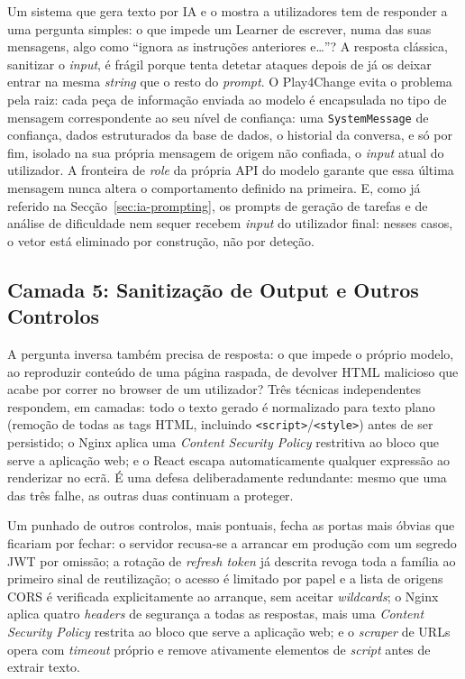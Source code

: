 Um sistema que gera texto por IA e o mostra a utilizadores tem de responder a uma pergunta simples: o que impede um Learner de escrever, numa das suas mensagens, algo como ``ignora as instruções anteriores e\ldots''? A resposta clássica, sanitizar o \textit{input}, é frágil porque tenta detetar ataques depois de já os deixar entrar na mesma \textit{string} que o resto do \textit{prompt}. O Play4Change evita o problema pela raiz: cada peça de informação enviada ao modelo é encapsulada no tipo de mensagem correspondente ao seu nível de confiança: uma \texttt{SystemMessage} de confiança, dados estruturados da base de dados, o historial da conversa, e só por fim, isolado na sua própria mensagem de origem não confiada, o \textit{input} atual do utilizador. A fronteira de \textit{role} da própria API do modelo garante que essa última mensagem nunca altera o comportamento definido na primeira. E, como já referido na Secção~\ref{sec:ia-prompting}, os prompts de geração de tarefas e de análise de dificuldade nem sequer recebem \textit{input} do utilizador final: nesses casos, o vetor está eliminado por construção, não por deteção.

\subsection*{Camada 5: Sanitização de Output e Outros Controlos} \label{sec:xss}

A pergunta inversa também precisa de resposta: o que impede o próprio modelo, ao reproduzir conteúdo de uma página raspada, de devolver HTML malicioso que acabe por correr no browser de um utilizador? Três técnicas independentes respondem, em camadas: todo o texto gerado é normalizado para texto plano (remoção de todas as tags HTML, incluindo \texttt{<script>}/\texttt{<style>}) antes de ser persistido; o Nginx aplica uma \textit{Content Security Policy} restritiva ao bloco que serve a aplicação web; e o React escapa automaticamente qualquer expressão ao renderizar no ecrã. É uma defesa deliberadamente redundante: mesmo que uma das três falhe, as outras duas continuam a proteger. \label{sec:validacao}

Um punhado de outros controlos, mais pontuais, fecha as portas mais óbvias que ficariam por fechar: o servidor recusa-se a arrancar em produção com um segredo JWT por omissão; a rotação de \textit{refresh token} já descrita revoga toda a família ao primeiro sinal de reutilização; o acesso é limitado por papel e a lista de origens CORS é verificada explicitamente ao arranque, sem aceitar \textit{wildcards}; o Nginx aplica quatro \textit{headers} de segurança a todas as respostas, mais uma \textit{Content Security Policy} restrita ao bloco que serve a aplicação web; e o \textit{scraper} de URLs opera com \textit{timeout} próprio e remove ativamente elementos de \textit{script} antes de extrair texto. \label{sec:outros-seguranca}

